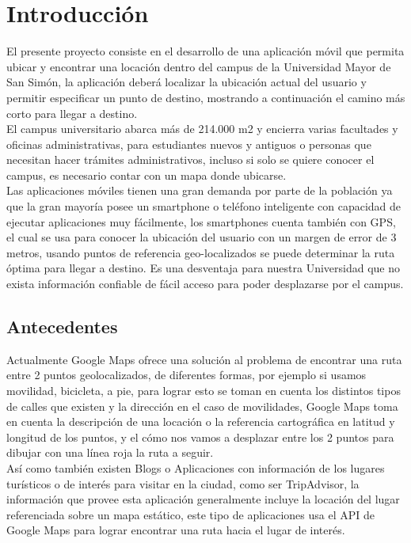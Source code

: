 \chapter{Introducción} %
\label{cha:introduccion}

El presente proyecto consiste en el desarrollo de una aplicación móvil que permita ubicar y encontrar una locación dentro del campus de la Universidad Mayor de San Simón, la aplicación deberá localizar la ubicación actual del usuario y permitir especificar un punto de destino, mostrando a continuación el camino más corto para llegar a destino.\\

El campus universitario abarca más de 214.000 m2 y encierra varias facultades y
oficinas administrativas, para estudiantes nuevos y antiguos o personas que
necesitan hacer trámites administrativos, incluso si solo se quiere conocer el
campus, es necesario contar con un mapa donde ubicarse.\\

Las aplicaciones móviles tienen una gran demanda por parte de la población ya
que la gran mayoría posee un smartphone o teléfono inteligente con capacidad de
ejecutar aplicaciones muy fácilmente, los smartphones cuenta también con GPS,
el cual se usa para conocer la ubicación del usuario con un margen de error de
3 metros, usando puntos de referencia geo-localizados se puede determinar la
ruta óptima para llegar a destino. Es una desventaja para nuestra Universidad que no exista información confiable de fácil acceso para poder desplazarse por el campus.\\

  \section{Antecedentes} %
  \label{sec:antecedentes}
  Actualmente Google Maps ofrece una solución al problema de encontrar una ruta entre 2 puntos geolocalizados, de diferentes formas, por ejemplo si usamos movilidad, bicicleta, a pie, para lograr esto se toman en cuenta los distintos tipos de calles que existen y la dirección en el caso de movilidades, Google Maps toma en cuenta la descripción de una locación o la referencia cartográfica en latitud y longitud de los puntos, y el cómo nos vamos a desplazar entre los 2 puntos para dibujar con una línea roja la ruta a seguir.\\


  Así como también existen Blogs o Aplicaciones con información de los lugares turísticos o de interés para visitar en la ciudad, como ser TripAdvisor, la información que provee esta aplicación generalmente incluye la locación del lugar referenciada sobre un mapa estático, este tipo de aplicaciones usa el API de Google Maps para lograr encontrar una ruta hacia el lugar de interés.\\


